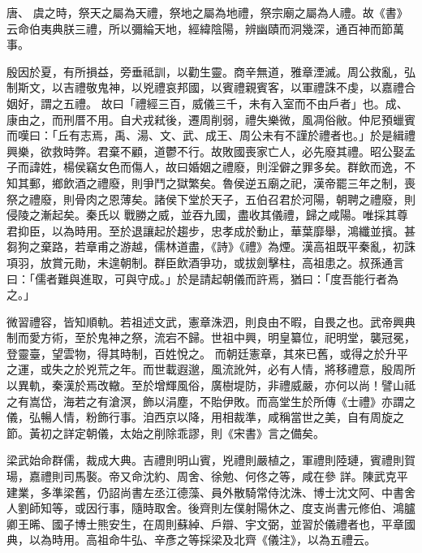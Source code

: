 
\begin{pinyinscope}

 唐、
 虞之時，祭天之屬為天禮，祭地之屬為地禮，祭宗廟之屬為人禮。故《書》云命伯夷典朕三禮，所以彌綸天地，經緯陰陽，辨幽賾而洞幾深，通百神而節萬事。



 殷因於夏，有所損益，旁垂祗訓，以勸生靈。商辛無道，雅章湮滅。周公救亂，弘制斯文，以吉禮敬鬼神，以兇禮哀邦國，以賓禮親賓客，以軍禮誅不虔，以嘉禮合姻好，謂之五禮。
 故曰「禮經三百，威儀三千，未有入室而不由戶者」也。成、康由之，而刑厝不用。自犬戎弒後，遷周削弱，禮失樂微，風凋俗敝。仲尼預蠟賓而嘆曰：「丘有志焉，禹、湯、文、武、成王、周公未有不謹於禮者也。」於是緝禮興樂，欲救時弊。君棄不顧，道鬱不行。故敗國喪家亡人，必先廢其禮。昭公娶孟子而諱姓，楊侯竊女色而傷人，故曰婚姻之禮廢，則淫僻之罪多矣。群飲而逸，不知其郵，鄉飲酒之禮廢，則爭鬥之獄繁矣。魯侯逆五廟之祀，漢帝罷三年之制，喪祭之禮廢，則骨肉之恩薄矣。諸侯下堂於天子，五伯召君於河陽，朝聘之禮廢，則侵陵之漸起矣。秦氏以
 戰勝之威，並吞九國，盡收其儀禮，歸之咸陽。唯採其尊君抑臣，以為時用。至於退讓起於趨步，忠孝成於動止，華葉靡舉，鴻纖並擯。甚芻狗之棄路，若章甫之游越，儒林道盡，《詩》《禮》為煙。漢高祖既平秦亂，初誅項羽，放賞元勛，未遑朝制。群臣飲酒爭功，或拔劍擊柱，高祖患之。叔孫通言曰：「儒者難與進取，可與守成。」於是請起朝儀而許焉，猶曰：「度吾能行者為之。」



 微習禮容，皆知順軌。若祖述文武，憲章洙泗，則良由不暇，自畏之也。武帝興典制而愛方術，至於鬼神之祭，流宕不歸。世祖中興，明皇纂位，祀明堂，襲冠冕，登靈臺，望雲物，得其時制，百姓悅之。
 而朝廷憲章，其來已舊，或得之於升平之運，或失之於兇荒之年。而世載遐邈，風流訛舛，必有人情，將移禮意，殷周所以異軌，秦漢於焉改轍。至於增輝風俗，廣樹堤防，非禮威嚴，亦何以尚！譬山祗之有嵩岱，海若之有滄溟，飾以涓塵，不貽伊敗。而高堂生於所傳《士禮》亦謂之儀，弘暢人情，粉飾行事。洎西京以降，用相裁準，咸稱當世之美，自有周旋之節。黃初之詳定朝儀，太始之削除乖謬，則《宋書》言之備矣。



 梁武始命群儒，裁成大典。吉禮則明山賓，兇禮則嚴植之，軍禮則陸璉，賓禮則賀瑒，嘉禮則司馬褧。帝又命沈約、周舍、徐勉、何佟之等，咸在參
 詳。陳武克平建業，多準梁舊，仍詔尚書左丞江德藻、員外散騎常侍沈洙、博士沈文阿、中書舍人劉師知等，或因行事，隨時取舍。後齊則左僕射陽休之、度支尚書元修伯、鴻臚卿王晞、國子博士熊安生，在周則蘇綽、戶辯、宇文弼，並習於儀禮者也，平章國典，以為時用。高祖命牛弘、辛彥之等採梁及北齊《儀注》，以為五禮云。




\end{pinyinscope}
